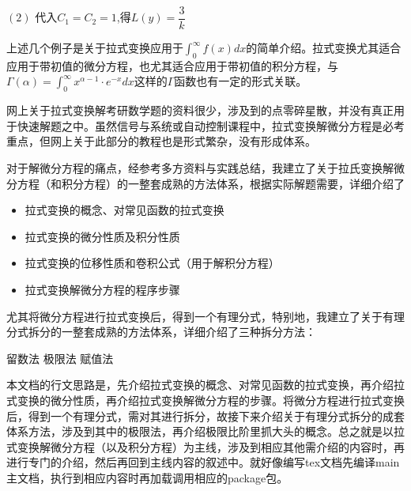 \documentclass[12pt]{report}
\begin{document}
  \vspace{-5pt}
  
  \hspace{3em}$(2)$ 代入$C_{1}=C_{2}=1$,得$L\left(y\right)=\dfrac{3}{k}$
  
  \clearpage
  
  \hspace{0.5em}上述几个例子是关于拉式变换应用于$\int_{0}^{\infty}f\left(x\right)dx$的简单介绍。拉式变换尤其适合应用于带初值的微分方程，也尤其适合应用于带初值的积分方程，与$\Gamma\left(\alpha\right)=\int_{0}^{\infty}x^{\alpha-1}\cdot e^{-x}dx$这样的$\Gamma$函数也有一定的形式关联。
  
  网上关于拉式变换解考研数学题的资料很少，涉及到的点零碎星散，并没有真正用于快速解题之中。虽然信号与系统或自动控制课程中，拉式变换解微分方程是必考重点，但网上关于此部分的教程也是形式繁杂，没有形成体系。
  
  对于解微分方程的痛点，经参考多方资料与实践总结，我建立了关于拉氏变换解微分方程（和积分方程）的一整套成熟的方法体系，根据实际解题需要，详细介绍了 \begin{itemize}
  	\item 拉式变换的概念、对常见函数的拉式变换
  	\item   拉式变换的微分性质及积分性质
  	\item   拉式变换的位移性质和卷积公式（用于解积分方程）
  	\item   拉式变换解微分方程的程序步骤
  \end{itemize}

尤其将微分方程进行拉式变换后，得到一个有理分式，特别地，我建立了关于有理分式拆分的一整套成熟的方法体系，详细介绍了三种拆分方法：

\vspace{-10pt}

\begin{center}
	\textbullet \hspace{0.5em} 留数法  \hspace{1cm}  \textbullet \hspace{0.5em} 极限法 \hspace{1cm}  \textbullet \hspace{0.5em} 赋值法 
\end{center}

\vspace{-10pt}

本文档的行文思路是，先介绍拉式变换的概念、对常见函数的拉式变换，再介绍拉式变换的微分性质，再介绍拉式变换解微分方程的步骤。将微分方程进行拉式变换后，得到一个有理分式，需对其进行拆分，故接下来介绍关于有理分式拆分的成套体系方法，涉及到其中的极限法，再介绍极限比阶里抓大头的概念。总之就是以拉式变换解微分方程（以及积分方程）为主线，涉及到相应其他需介绍的内容时，再进行专门的介绍，然后再回到主线内容的叙述中。就好像编写tex文档先编译main主文档，执行到相应内容时再加载调用相应的package包。
\end{document}
